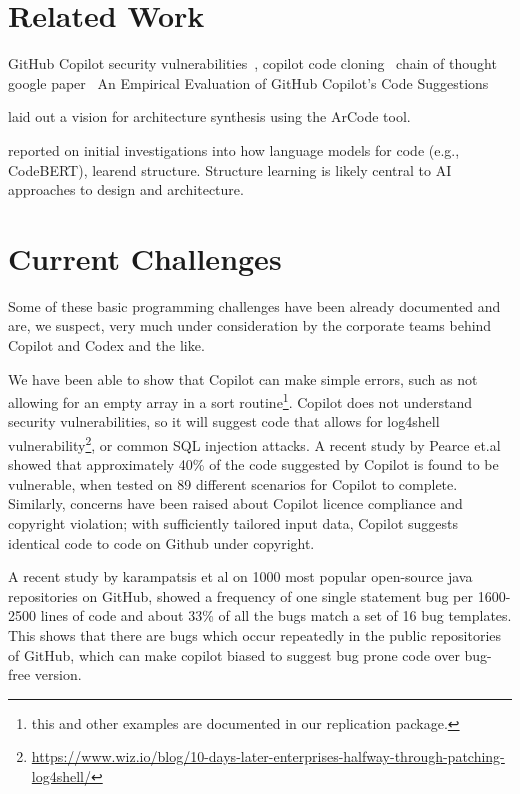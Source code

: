 \label{chapter:background}

\newlength{\savedunitlength}
\setlength{\unitlength}{2em}



\setlength{\unitlength}{\savedunitlength}

\section{Related Work}
GitHub Copilot security vulnerabilities~\cite{copilot_security}, copilot code cloning~\cite{code_clone}
chain of thought google paper~\cite{chain_of_thought}
An Empirical Evaluation of GitHub Copilot's Code Suggestions~\cite{empirical_eval}

\cite{Shokri2021} laid out a vision for architecture synthesis using the ArCode tool. 

\cite{Karmakar2021} reported on initial investigations into how language models for code (e.g., CodeBERT), learend structure. Structure learning is likely central to AI approaches to design and architecture.

\section{Current Challenges}
Some of these basic programming challenges have been already documented and are, we suspect, very much under consideration by the corporate teams behind Copilot and Codex and the like. 

We have been able to show that Copilot can make simple errors, such as not allowing for an empty array in a sort routine\footnote{this and other examples are documented in our replication package.}. Copilot does not understand security vulnerabilities, so it will suggest code that allows for \textsf{log4shell} vulnerability\footnote{\url{https://www.wiz.io/blog/10-days-later-enterprises-halfway-through-patching-log4shell/}}, or common SQL injection attacks. A recent study by Pearce et.al \cite{copilot_security} showed that approximately 40\% of the code suggested by Copilot is found to be vulnerable, when tested on 89 different scenarios for Copilot to complete.
Similarly, concerns have been raised about Copilot licence compliance and copyright violation; with sufficiently tailored input data, Copilot suggests identical code to code on Github under copyright. 

A recent study by karampatsis et al \cite{github_bugs} on 1000 most popular open-source java repositories on GitHub, showed a frequency of one single statement bug per 1600-2500 lines of code and about 33\% of all the bugs match a set of 16 bug templates. This shows that there are bugs which occur repeatedly in the public repositories of GitHub, which can make copilot biased to suggest bug prone code over bug-free version.

